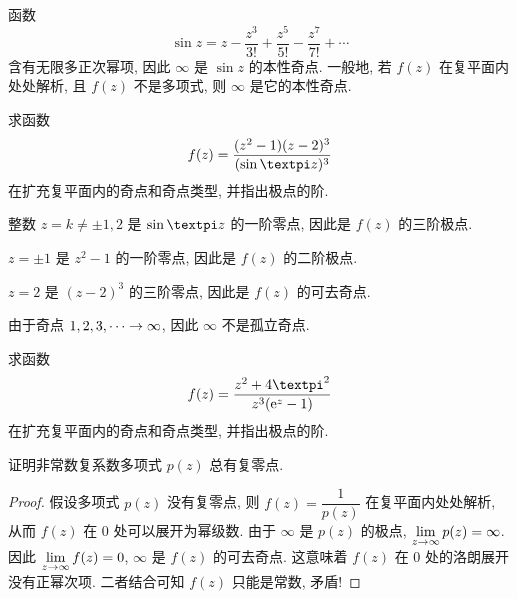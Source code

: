 \begin{example}
  函数 
  \[
    \sin z=z-\frac{z^3}{3!}+\frac{z^5}{5!}-\frac{z^7}{7!}+\cdots
  \]
  含有无限多正次幂项, 因此 $\infty$ 是 $\sin z$ 的本性奇点.
  一般地, 若 $f(z)$ 在复平面内处处解析, 且 $f(z)$ 不是多项式, 则 $\infty$ 是它的本性奇点.
\end{example}

\begin{example}
  求函数
  \[
    f(z)=\dfrac{(z^2-1)(z-2)^3}{(\sin{\cpi z})^3}
  \]
  在扩充复平面内的奇点和奇点类型, 并指出极点的阶.
\end{example}

\begin{solutionenum}
  \item 整数 $z=k\neq \pm1,2$ 是 $\sin{\cpi z}$ 的一阶零点, 因此是 $f(z)$ 的三阶极点.
  \item $z=\pm1$ 是 $z^2-1$ 的一阶零点, 因此是 $f(z)$ 的二阶极点.
  \item $z=2$ 是 $(z-2)^3$ 的三阶零点, 因此是 $f(z)$ 的可去奇点.
  \item 由于奇点 $1,2,3,\cdots\rightarrow \infty$, 因此 $\infty$ 不是孤立奇点.
\end{solutionenum}

\begin{exercise}
  求函数
  \[
    f(z)=\dfrac{z^2+4\cpi^2}{z^3(\ee^z-1)}
  \]
  在扩充复平面内的奇点和奇点类型, 并指出极点的阶.
\end{exercise}

\begin{example}[代数学基本定理]
  \label{exam:algebraic-basic-theorem}
  证明非常数复系数多项式 $p(z)$ 总有复零点.\footnotemark
\end{example}

\begin{proof}
  假设多项式 $p(z)$ 没有复零点, 则 $f(z)=\dfrac1{p(z)}$ 在复平面内处处解析, 从而 $f(z)$ 在 $0$ 处可以展开为幂级数.
  由于 $\infty$ 是 $p(z)$ 的极点, $\lim\limits_{z\rightarrow\infty}p(z)=\infty$.
  因此 $\lim\limits_{z\rightarrow\infty}f(z)=0$, $\infty$ 是 $f(z)$ 的可去奇点.
  这意味着 $f(z)$ 在 $0$ 处的洛朗展开没有正幂次项.
  二者结合可知 $f(z)$ 只能是常数, 矛盾!
\end{proof}




